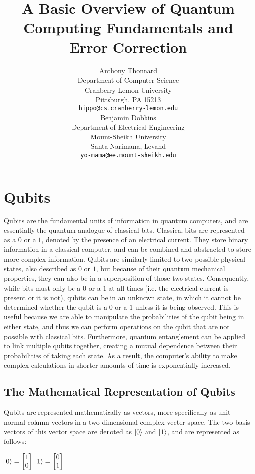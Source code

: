 \documentclass{article}
\title{A Basic Overview of Quantum Computing Fundamentals and Error Correction}
\author{Anthony Thonnard \\
	Department of Computer Science\\
	Cranberry-Lemon University\\
	Pittsburgh, PA 15213 \\
	\texttt{hippo@cs.cranberry-lemon.edu} \\
	\And
	Benjamin Dobbins \\
	Department of Electrical Engineering\\
	Mount-Sheikh University\\
	Santa Narimana, Levand \\
	\texttt{yo-mama@ee.mount-sheikh.edu} \\
}
\begin{document}
\maketitle

\begin{abstract}
	\lipsum[1]
\end{abstract}



\section{Qubits}
\label{sec:qubits}
Qubits are the fundamental units of information in quantum computers, and are essentially the quantum analogue of classical bits. Classical bits are represented as a $0$ or 
a $1$, denoted by the presence of an electrical current. They store binary information in a classical computer, and can be combined and abstracted to store more complex 
information. Qubits are similarly limited to two possible physical states, also described as $0$ or $1$, but because of their quantum mechanical properties, they can also be 
in a superposition of those two states. Consequently, while bits must only be a $0$ or a $1$ at all times (i.e. the electrical current is present or it is not), qubits 
can be in an unknown state, in which it cannot be determined whether the qubit is a $0$ or a $1$ unless it is being observed. This is useful because we are able to manipulate 
the probabilities of the qubit being in either state, and thus we can perform operations on the qubit that are not possible with classical bits. Furthermore, 
quantum entanglement can be applied to link multiple qubits together, creating a mutual dependence between their probabilities of taking each state. As a result, the computer's
ability to make complex calculations in shorter amounts of time is exponentially increased.

\subsection{The Mathematical Representation of Qubits}
\label{sec:mathrep}
Qubits are represented mathematically as vectors, more specifically as unit normal column vectors in a two-dimensional complex vector space. The two basis vectors of this 
vector space are denoted as $\ket{0}$ and $\ket{1}$, and are represented as follows: 

\begin{center}
	$\ket{0} = \begin{bmatrix} 1 \\ 0 \end{bmatrix}$ \hspace{1cm} $\ket{1} = \begin{bmatrix} 0 \\ 1 \end{bmatrix}$	
\end{center}
\end{document}
